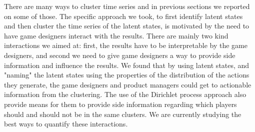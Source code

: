 
There are many ways to cluster time series and in previous sections we reported on some of those. The specific approach we took, to first identify latent states and then cluster the time series of the latent states, is motivated by the need to have game designers interact with the results.  There are mainly two kind interactions we aimed at: first, the results have to be interpretable by the game designers, and second we need to give game designers a way to provide side information and influence the results.  We found that by using latent states, and "naming" the latent states using the properties of the distribution of the actions they generate, the game designers and product managers could get to actionable information from the clustering.  The use of the Dirichlet process approach also provide means for them to provide side information regarding which players should and should not be in the same clusters.  We are currently studying the best ways to quantify these interactions. 

